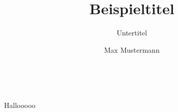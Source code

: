 \documentclass[a4paper,11pt,blue,twoside]{tubsreprt}
\title{Beispieltitel}
\subtitle{Untertitel}
\author{Max Mustermann}
\begin{document}
\maketitle[image]
~
\makebackpage[plain]


Hallooooo
\end{document}
